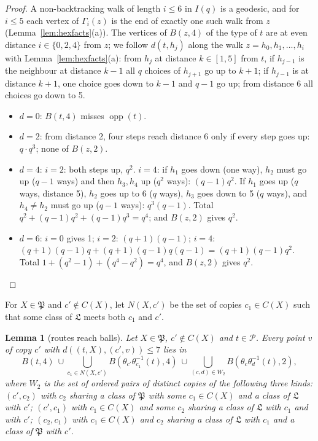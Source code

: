 \documentclass[11pt]{amsart}
\newtheorem{lemma}[theorem]{Lemma}
\theoremstyle{definition}
\theoremstyle{remark}
\numberwithin{equation}{section}
\newcommand{\opp}{\operatorname{opp}}
\newcommand{\cP}{\mathcal P}
\begin{document}
\begin{proof}
A non-backtracking walk of length $i\le6$ in $I(q)$ is a geodesic, and for $i\le5$ each vertex of $\Gamma_i(z)$ is the end of
exactly one such walk from $z$ (Lemma~\ref{lem:hexfacts}(a)). The vertices of $B(z,4)$ of the type of $t$ are at even
distance $i\in\{0,2,4\}$ from $z$; we follow $d(t,h_j)$ along the walk $z=h_0,h_1,\dots,h_i$ with Lemma~\ref{lem:hexfacts}(a):
from $h_j$ at distance $k\in[1,5]$ from $t$, if $h_{j-1}$ is the neighbour at distance $k-1$ all $q$ choices of $h_{j+1}$ go up
to $k+1$; if $h_{j-1}$ is at distance $k+1$, one choice goes down to $k-1$ and $q-1$ go up; from distance 6 all choices go
down to 5.
\begin{itemize}
\item $d=0$: $B(t,4)$ misses $\opp(t)$.
\item $d=2$: from distance 2, four steps reach distance 6 only if every step goes up: $q\cdot q^3$; none of $B(z,2)$.
\item $d=4$: $i=2$: both steps up, $q^2$. $i=4$: if $h_1$ goes down (one way), $h_2$ must go up ($q-1$ ways) and then
  $h_3,h_4$ up ($q^2$ ways): $(q-1)q^2$. If $h_1$ goes up ($q$ ways, distance 5), $h_2$ goes up to 6 ($q$ ways), $h_3$ goes
  down to 5 ($q$ ways), and $h_4\ne h_2$ must go up ($q-1$ ways): $q^3(q-1)$. Total $q^2+(q-1)q^2+(q-1)q^3=q^4$; and $B(z,2)$
  gives $q^2$.
\item $d=6$: $i=0$ gives 1; $i=2$: $(q+1)(q-1)$; $i=4$: $(q+1)(q-1)q+(q+1)(q-1)q(q-1)=(q+1)(q-1)q^2$. Total
  $1+(q^2-1)+(q^4-q^2)=q^4$, and $B(z,2)$ gives $q^2$.
\end{itemize}
\end{proof}

For $X\in\mathfrak P$ and $c'\notin C(X)$, let $N(X,c')$ be the set of copies $c_1\in C(X)$ such that some class of $\mathfrak
L$ meets both $c_1$ and $c'$.

\begin{lemma}[routes reach balls]\label{lem:routes}
Let $X\in\mathfrak P$, $c'\notin C(X)$ and $t\in\cP$. Every point $v$ of copy $c'$ with $d((t,X),(c',v))\le7$ lies in
\[
B(t,4)\ \cup\bigcup_{c_1\in N(X,c')}B(\theta_{c'}\theta_{c_1}^{-1}(t),4)\ \cup\bigcup_{(c,d)\in W_2}B(\theta_c\theta_d^{-1}(t),2),
\]
where $W_2$ is the set of ordered pairs of distinct copies of the following three kinds: $(c',c_2)$ with $c_2$ sharing a class
of $\mathfrak P$ with some $c_1\in C(X)$ and a class of $\mathfrak L$ with $c'$; $(c',c_1)$ with $c_1\in C(X)$ and some $c_2$
sharing a class of $\mathfrak L$ with $c_1$ and with $c'$; $(c_2,c_1)$ with $c_1\in C(X)$ and $c_2$ sharing a class of
$\mathfrak L$ with $c_1$ and a class of $\mathfrak P$ with $c'$.
\end{lemma}
\end{document}
